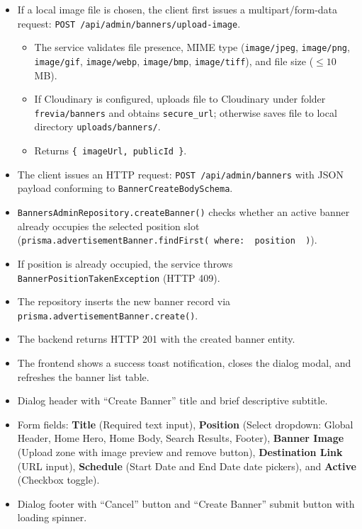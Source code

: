 \begin{itemize}[leftmargin=1.6em,topsep=3pt,itemsep=2pt,parsep=0pt,label=$\bullet$]
    \item If a local image file is chosen, the client first issues a multipart/form-data request: \texttt{POST /api/admin/banners/upload-image}.
        \begin{itemize}[leftmargin=1.6em,topsep=2pt,itemsep=2pt,parsep=0pt]
            \item The service validates file presence, MIME type (\texttt{image/jpeg}, \texttt{image/png}, \texttt{image/gif}, \texttt{image/webp}, \texttt{image/bmp}, \texttt{image/tiff}), and file size ($\le 10$MB).
            \item If Cloudinary is configured, uploads file to Cloudinary under folder \texttt{frevia/banners} and obtains \texttt{secure\_url}; otherwise saves file to local directory \texttt{uploads/banners/}.
            \item Returns \texttt{\{ imageUrl, publicId \}}.
        \end{itemize}
    \item The client issues an HTTP request: \texttt{POST /api/admin/banners} with JSON payload conforming to \texttt{BannerCreateBodySchema}.
    \item \texttt{BannersAdminRepository.createBanner()} checks whether an active banner already occupies the selected position slot (\texttt{prisma.advertisementBanner.findFirst({ where: { position } })}).
    \item If position is already occupied, the service throws \texttt{BannerPositionTakenException} (HTTP 409).
    \item The repository inserts the new banner record via \texttt{prisma.\allowbreak{}advertisement\allowbreak{}Banner.\allowbreak{}create()}.
    \item The backend returns HTTP 201 with the created banner entity.
    \item The frontend shows a success toast notification, closes the dialog modal, and refreshes the banner list table.
\end{itemize}

\begin{itemize}[leftmargin=1.6em,topsep=3pt,itemsep=2pt,parsep=0pt,label=$\bullet$]
    \item Dialog header with ``Create Banner'' title and brief descriptive subtitle.
    \item Form fields: \textbf{Title} (Required text input), \textbf{Position} (Select dropdown: Global Header, Home Hero, Home Body, Search Results, Footer), \textbf{Banner Image} (Upload zone with image preview and remove button), \textbf{Destination Link} (URL input), \textbf{Schedule} (Start Date and End Date date pickers), and \textbf{Active} (Checkbox toggle).
    \item Dialog footer with ``Cancel'' button and ``Create Banner'' submit button with loading spinner.
\end{itemize}

